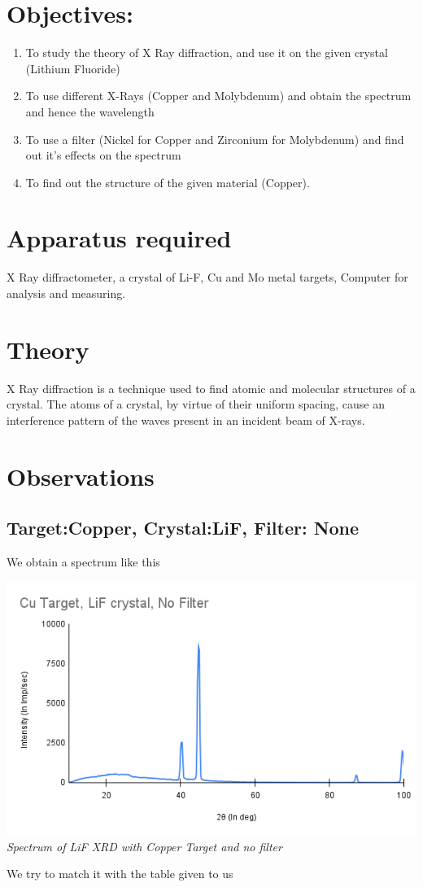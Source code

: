 \documentclass[]{report}[12 pt]
\begin{document}
	
	\section*{Objectives:}
	\begin{enumerate}
	\item To study the theory of X Ray diffraction, and use it on the given crystal (Lithium Fluoride)
	\item To use different X-Rays (Copper and Molybdenum) and obtain the spectrum and hence the wavelength
	\item To use a filter (Nickel for Copper and Zirconium for Molybdenum) and find out it's effects on the spectrum
	\item To find out the structure of the given material (Copper).
	\end{enumerate}
	\section*{Apparatus required}
	X Ray diffractometer, a crystal of Li-F, Cu and Mo metal targets, Computer for analysis and measuring.
	\section*{Theory}
	X Ray diffraction is a technique used to find atomic and molecular structures of a crystal. The atoms of a crystal, by virtue of their uniform spacing, cause an interference pattern of the waves present in an incident beam of X-rays. 
	
	\section*{Observations}
	\subsection*{Target:Copper, Crystal:LiF, Filter: None}
	We obtain a spectrum like this\\
	\begin{center}
		\includegraphics[width=10 cm]{Cu Target, LiF crystal, No Filter.png}\\
		\textit{Spectrum of LiF XRD with Copper Target and no filter}
	\end{center}
	We try to match it with the table given to us
\end{document}
